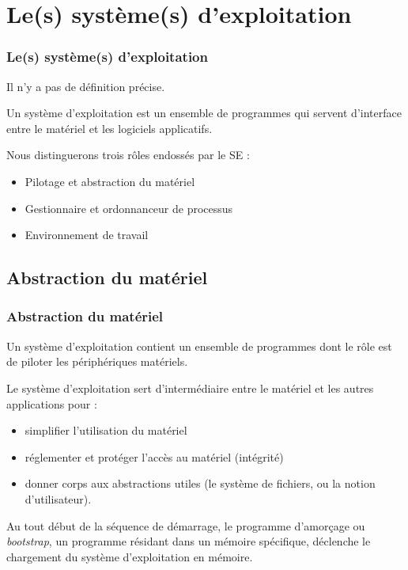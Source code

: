 \documentclass[xcolor=svgnames]{beamer}
\begin{document}
\section[Plan]{}
\frame[label=plan]{\tableofcontents%
}

\section{Le(s) système(s) d'exploitation}
\begin{frame}
\frametitle{Le(s) système(s) d'exploitation}

Il n'y a pas de définition précise.\pause
\begin{definition}
  Un \alert{système d'exploitation} est un ensemble de programmes qui
  servent d'interface entre le matériel et les logiciels applicatifs. 
\end{definition}
\pause
Nous distinguerons trois rôles endossés par le SE :
\pause
  \begin{itemize}
  \item Pilotage et abstraction du matériel\pause
  \item Gestionnaire et ordonnanceur de processus\pause
  \item Environnement de travail
  \end{itemize}
\end{frame}


\subsection{Abstraction du matériel}
\begin{frame}
  \frametitle{Abstraction du matériel} 
Un système d'exploitation contient un ensemble de programmes dont le
rôle est de piloter les périphériques matériels. \pause 

Le système d'exploitation sert d'intermédiaire entre le
matériel et les autres applications pour :\pause
\begin{itemize}
  \item simplifier l'utilisation  du matériel\pause
  \item réglementer et protéger l'accès au matériel (intégrité)\pause
  \item donner corps aux abstractions utiles (le \alert{système de
    fichiers}, ou la notion d'utilisateur).\pause
\end{itemize}
Au tout début de la séquence de démarrage, le programme
\alert{d'amorçage} ou \emph{bootstrap}, un programme résidant dans un
mémoire spécifique, déclenche le chargement du système
d'exploitation en mémoire.
\end{frame}
\end{document}
